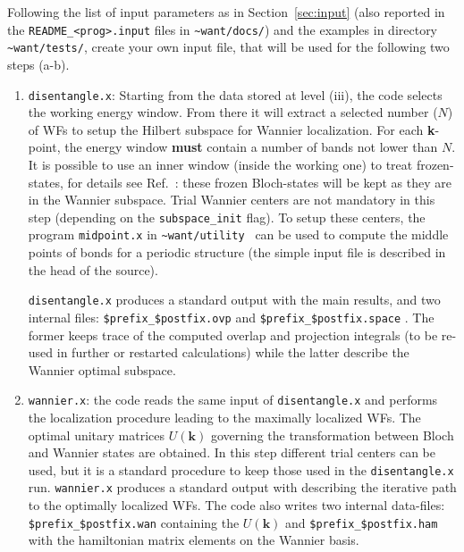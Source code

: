 Following the list of input parameters as in
Section~\ref{sec:input} (also reported in the {\tt README\_<prog>.input} files
in {\tt \~{}want/docs/}) and the examples in directory {\tt \~{}want/tests/},
create your own input file, that will be used for the following two steps (a-b).
\renewcommand{\theenumi}{\alph{enumi}}
\renewcommand{\labelenumi}{\theenumi)}
%
%
\begin{enumerate}
\item {\tt disentangle.x}: Starting from the data stored at level (iii),
      the code selects the working energy window. From there
      it will extract a selected number ($N$) of WFs to setup the
      Hilbert subspace for Wannier localization.
      For each \textbf{k}-point, the energy window {\bf must}
      contain a number of bands not lower than $N$.
      It is possible to use an inner window (inside the working one) to
      treat frozen-states, for details see Ref.~\cite{ivo2}:
      these frozen Bloch-states will be kept as they are in the Wannier subspace.
      Trial Wannier centers are not mandatory in this step (depending
      on the {\tt subspace\_init} flag).
      To setup these centers, the program {\tt midpoint.x} in 
      {\tt \~{}want/utility } can be used to compute
      the middle points of bonds for a periodic structure (the simple input file 
      is described in the head of the source). 

      {\tt disentangle.x} produces a standard output with the main results,
      and two internal files: {\tt \$prefix\_\$postfix.ovp} and
      {\tt \$prefix\_\$postfix.space} . The former keeps trace of the
      computed overlap and projection integrals (to be re-used in further
      or restarted calculations) while the latter describe the Wannier optimal
      subspace.

\item {\tt wannier.x}: the code reads the same input of {\tt disentangle.x} and
      performs the localization
      procedure leading to the maximally localized WFs.
      The optimal unitary matrices $U(\mathbf{k})$ governing the transformation between
      Bloch and Wannier states are obtained.
      In this step different trial centers can be used, but it is a standard procedure
      to keep those used in the {\tt disentangle.x} run.
      {\tt wannier.x} produces a standard output with describing the iterative
      path to the optimally localized WFs.
      The code also writes two internal data-files: {\tt \$prefix\_\$postfix.wan}
      containing the $U(\mathbf{k})$ and {\tt \$prefix\_\$postfix.ham} with the
      hamiltonian matrix elements on the Wannier basis.
\end{enumerate}
%
%

